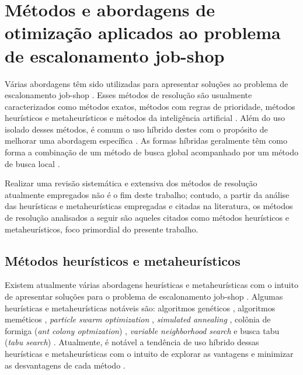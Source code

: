 \documentclass[relatorio,nocolorlinks]{inf-ufg}
\begin{document}
\section{M\'{e}todos e abordagens de otimiza\c{c}\~{a}o aplicados ao problema de escalonamento job-shop}

V\'{a}rias abordagens t\^{e}m sido utilizadas para apresentar solu\c{c}\~{o}es ao problema de escalonamento job-shop \cite{Chen2011}. Esses
m\'{e}todos de resolu\c{c}\~{a}o s\~{a}o usualmente caracterizados como m\'{e}todos exatos, m\'{e}todos com regras de prioridade, m\'{e}todos
heur\'{i}sticos e metaheur\'{i}sticos e m\'{e}todos da intelig\^{e}ncia artificial \cite{Chen2011}. Al\'{e}m do uso isolado desses m\'{e}todos,
\'{e} comum o uso h\'{i}brido destes com o prop\'{o}sito de melhorar uma abordagem espec\'{i}fica \cite{Gendreau2010}. As formas h\'{i}bridas
geralmente t\^{e}m como forma a combina\c{c}\~{a}o de um m\'{e}todo de busca global acompanhado por um m\'{e}todo de busca local \cite{Chen2011}.

Realizar uma revis\~{a}o sistem\'{a}tica e extensiva dos m\'{e}todos de resolu\c{c}\~{a}o atualmente empregados n\~{a}o \'{e} o fim deste
trabalho; contudo, a partir da an\'{a}lise das heur\'{i}sticas e metaheur\'{i}sticas empregadas e citadas na literatura, os m\'{e}todos de
resolu\c{c}\~{a}o analisados a seguir s\~{a}o aqueles citados como m\'{e}todos heur\'{i}sticos e metaheur\'{i}sticos, foco primordial do presente
trabalho.

\subsection{M\'{e}todos heur\'{i}sticos e metaheur\'{i}sticos}

Existem atualmente v\'{a}rias abordagens heur\'{i}sticas e metaheur\'{i}sticas com o intuito de apresentar solu\c{c}\~{o}es para o problema de
escalonamento job-shop \cite{Chen2011}. Algumas heur\'{i}sticas e metaheur\'{i}sticas not\'{a}veis s\~{a}o: algoritmos gen\'{e}ticos
\cite{Goncalves2002} \cite{Ferrolho2007} \cite{Huang2010} \cite{Liu2011} \cite{Ma2010} \cite{Manikas2009} \cite{Jinghua2010} \cite{Rondon2009}
\cite{Xiaomei2010} \cite{Yin2007} \cite{Zhang2010b} \cite{Zhang2010}, algoritmos mem\'{e}ticos \cite{Gao2011}, \textit{particle swarm
optimization} \cite{Zhang2009} \cite{Lin2010}, \textit{simulated annealing} \cite{Lin2010}, col\^{o}nia de formiga (\textit{ant colony optmization})
\cite{Liouane2007} \cite{Rondon2009} \cite{Xing2010}, \textit{variable neighborhood search} \cite{Adibi2010} \cite{Roshanaei2009} e busca tabu
(\textit{tabu search}) \cite{Saidi2007} \cite{Zhang2010}. Atualmente, \'{e} not\'{a}vel a tend\^{e}ncia de uso h\'{i}brido dessas heur\'{i}sticas
e metaheur\'{i}sticas \cite{Gendreau2010} com o intuito de explorar as vantagens e minimizar as desvantagens de cada m\'{e}todo \cite{Chen2011}.
\end{document}
